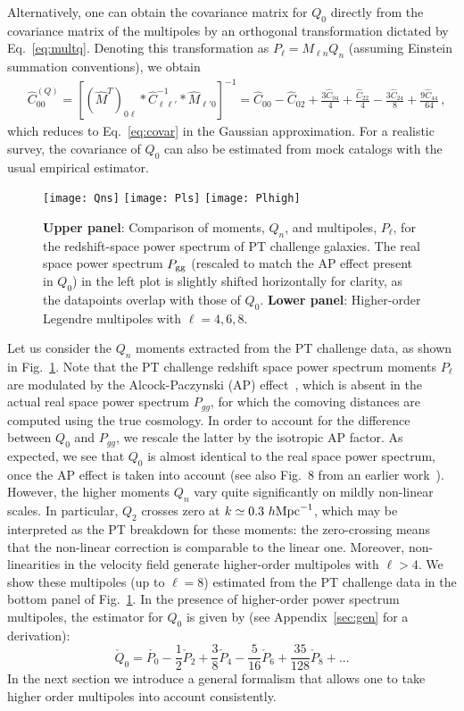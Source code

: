 \documentclass[12pt,a4paper]{article}
\newcommand{\be}{\begin{equation}}
\newcommand{\ee}{\end{equation}}
\newcommand{\hmpc}{h{\rm Mpc}^{-1}}
\begin{document}
Alternatively, one can obtain the covariance matrix 
for $Q_0$ directly from the covariance matrix of the multipoles
by an orthogonal transformation dictated by Eq.~\eqref{eq:multq}. 
Denoting this transformation as $P_{\ell} = M_{\ell n}Q_n$ (assuming Einstein summation conventions), we obtain
\be
\begin{split}
& \hat{C}^{(Q)}_{00}= [(\hat{M}^{T})_{0\ell} * \hat{C}^{-1}_{\ell \ell'}* \hat{M}_{\ell' 0}]^{-1}
= \hat C_{00}-\hat C_{02}+\frac{3 \hat C_{04}}{4}+\frac{\hat C_{22}}{4}-\frac{3 \hat C_{24}}{8}+\frac{9 \hat C_{44}}{64}\,,
\end{split}
\ee
which reduces to Eq.~\eqref{eq:covar} in the Gaussian approximation.
For a realistic survey, 
the covariance of $Q_0$ can also be estimated from mock 
catalogs with the usual empirical estimator.


\begin{figure*}[h!]
\centering
 \texttt{[image: Qns]}
  \texttt{[image: Pls]}
  \texttt{[image: Plhigh]}
    \caption{\textbf{Upper panel}: Comparison of moments, $Q_n$, and multipoles, $P_\ell$, for the redshift-space power spectrum of PT challenge galaxies. The real space power spectrum $P_{\rm gg}$ (rescaled to match the AP effect present in $Q_0$) in the left plot is slightly shifted horizontally for clarity, as the datapoints overlap with those of $Q_0$. \textbf{Lower panel}: Higher-order Legendre multipoles with $\ell=4,6,8$.
    }
    \label{fig:qs}
\end{figure*}
Let us consider the $Q_n$ moments extracted from the PT challenge data, as shown in Fig.~\ref{fig:qs}. 
Note that the PT challenge 
redshift space power spectrum moments $P_\ell$ 
are modulated by the Alcock-Paczynski (AP) effect~\cite{Alcock:1979mp}, which is absent in the actual real space power 
spectrum $P_{gg}$, for which the comoving 
distances are computed using the true cosmology.
In order to account for the difference between $Q_0$
and $P_{gg}$, we rescale the latter by the isotropic AP 
factor.
As expected, we see that $Q_0$
is almost identical to the real space power spectrum, once
the AP effect is taken into account (see also Fig.~8 from an earlier work~\cite{Scoccimarro:2004tg}).
However, the higher moments $Q_n$ vary quite significantly on mildly non-linear scales.
In particular, $Q_2$ crosses zero at $k\simeq 0.3~\hmpc$, which may be interpreted
as the PT breakdown for these moments: the zero-crossing means that the non-linear correction
is comparable to the linear one. 
Moreover, non-linearities in the velocity field generate higher-order multipoles with $\ell>4$. 
We show these multipoles (up to $\ell=8$)
estimated from the PT challenge data
in the bottom panel of Fig.~\ref{fig:qs}.
In the presence of higher-order power spectrum multipoles, the estimator for 
$Q_0$ is given by (see Appendix~\ref{sec:gen} for a derivation):
\be 
\check{Q}_0=\check{P_0}-\frac{1}{2}\check{P}_2+\frac{3}{8}\check{P}_4-\frac{5}{16}\check{P}_6+\frac{35}{128}\check{P}_8+...
\ee
In the next section we introduce a general formalism 
that allows one to take higher order multipoles into account consistently.
\end{document}
